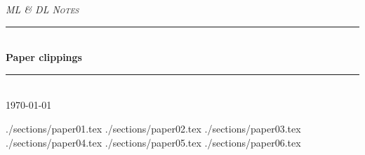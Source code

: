 \documentclass[12pt]{article} %
\begin{document}

\begin{titlepage}

\newcommand{\HRule}{\rule{\linewidth}{0.5mm}} %

\center %

\textsc{\Large \textit{ML \& DL Notes}}\\[0.5cm] %

\HRule \\[0.4cm]
{ \huge \bfseries Paper clippings}\\[0.4cm] %
\HRule \\[1.5cm]

{\large \today}\\[3cm] %


\vfill %

\end{titlepage}


\tableofcontents %

\newpage %

 {./sections/paper01.tex}
 {./sections/paper02.tex}
 {./sections/paper03.tex}
 {./sections/paper04.tex}
 {./sections/paper05.tex}
 {./sections/paper06.tex}
\end{document}
